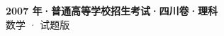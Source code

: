 \documentclass[zihao=-4, a4paper]{ctexart}
\begin{document}
\begin{center}
  {\Large\bfseries 2007 年·普通高等学校招生考试·四川卷·理科}\\[4pt]
  {\large 数学 · 试题版}
\end{center}
\medskip
{}

\end{document}
